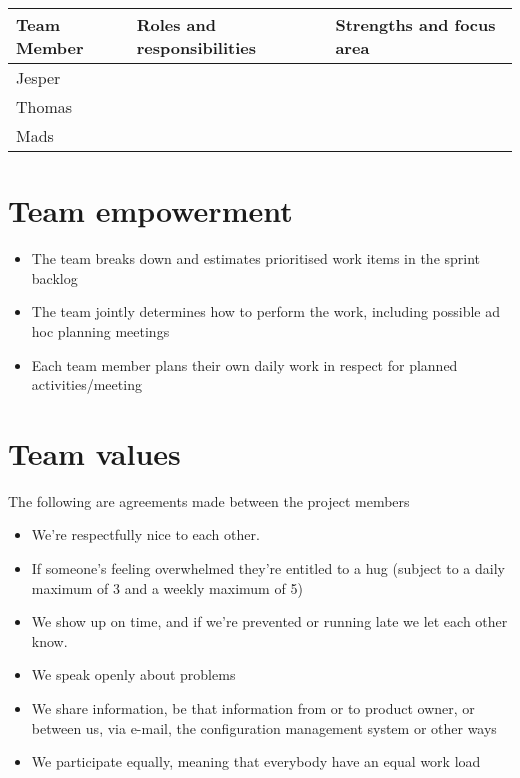 \documentclass[a4paper,11pt]{article}
\begin{document}
\begin{tabular}{|p{3cm}|p{5cm}|p{5cm}|}
\hline
\textbf{Team Member}              & \textbf{Roles and responsibilities}   & \textbf{Strengths and focus area} \\\hline
Jesper                   &                              &                          \\\hline
Thomas                   &                              &                          \\\hline
Mads                     &                              &                          \\\hline 
\end{tabular}


\section{Team empowerment} %
\label{sec:team_empowerment}
\begin{itemize}
	\item The team breaks down and estimates prioritised work items in the sprint backlog

	\item The team jointly determines how to perform the work, including possible ad hoc planning meetings

	\item Each team member plans their own daily work in respect for planned activities/meeting
\end{itemize}


\section{Team values} %
\label{sec:team_values}
The following are agreements made between the project members

\begin{itemize}
	\item We're respectfully nice to each other.

  	\item If someone's feeling overwhelmed they're entitled to a hug (subject to a daily maximum of 3 and a weekly maximum of 5)

  	\item We show up on time, and if we're prevented or running late we let each other know.

  	\item We speak openly about problems

  	\item We share information, be that information from or to product owner, or between us, via e-mail, the configuration management system or other ways

  	\item We participate equally, meaning that everybody have an equal work load
\end{itemize}
\end{document}
